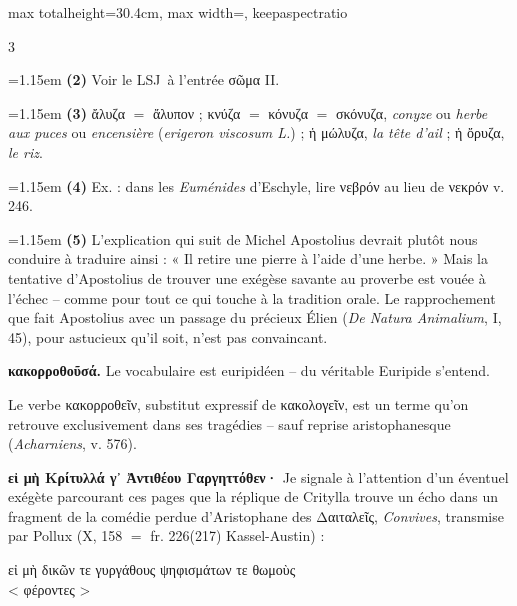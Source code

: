 \documentclass[11pt,twoside]{book}
\newcommand{\italique}[1]{\textit{#1}}
\newcommand{\citComm}[1]{\begin{quoting}[vskip=0.4pt,leftmargin=0.7em,rightmargin=0.2em]#1\end{quoting}}
\newcommand{\LSJ}{LSJ}
\newcommand{\latin}[1]{\textit{#1}}
\begin{document}
\begin{adjustbox}{max totalheight=30.4cm, max width=\textwidth, keepaspectratio}
\begin{minipage}{\textwidth}
{\begin{multicols}{3}
\par\vspace{1.5pt}
\noindent\hangindent=1.15em {\color{sepiaNote}\textbf{(2)}} Voir le \LSJ \ à l'entrée σῶμα II.
\par\vspace{1.5pt}
\noindent\hangindent=1.15em {\color{sepiaNote}\textbf{(3)}} ἄλυζα $=$ ἄλυπον ; κνύζα	 $=$ κόνυζα $=$ σκόνυζα, \italique{conyze} ou \italique{herbe aux puces} ou \italique{encensière} (\latin{erigeron viscosum L.}) ; ἡ μώλυζα, \italique{la tête d'ail} ; ἡ ὄρυζα, \italique{le riz}.
\par\vspace{1.5pt}
\noindent\hangindent=1.15em {\color{sepiaNote}\textbf{(4)}} Ex. : dans les \italique{Euménides} d'Eschyle, lire νεβρόν au lieu de νεκρόν v. 246.
\par\vspace{1.5pt}
\noindent\hangindent=1.15em {\color{sepiaNote}\textbf{(5)}} L'explication qui suit de Michel Apostolius devrait plutôt nous conduire à traduire ainsi : « Il retire une pierre à l'aide d'une herbe. » Mais la tentative d'Apostolius de trouver une exégèse savante au proverbe est vouée à l'échec -- comme pour tout ce qui touche à la tradition orale. Le rapprochement que fait Apostolius avec un passage du précieux Élien (\italique{De Natura Animalium}, I, 45), pour astucieux qu'il soit, n'est pas convaincant.
\par\vspace{1.5pt}
 \textbf{κακορροθοῦσά.} Le vocabulaire est euripidéen -- du véritable Euripide s'entend.
\par\vspace{1.5pt}
\noindent Le verbe κακορροθεῖν, substitut expressif de κακολογεῖν, est un terme qu'on retrouve exclusivement dans ses tragédies -- sauf reprise aristophanesque (\italique{Acharniens}, v. 576).
\par\vspace{1.5pt}
 \textbf{εἰ μὴ Κρίτυλλά γ᾽ Ἀντιθέου Γαργηττόθεν·} Je signale à l'attention d'un éventuel exégète parcourant ces pages que la réplique de Critylla trouve un écho dans un fragment de la comédie perdue d'Aristophane des Δαιταλεῖς, \italique{Convives}, transmise par Pollux (X, 158 $=$ fr. 226(217) Kassel-Austin) :
\citComm{εἰ μὴ δικῶν τε γυργάθους ψηφισμάτων τε θωμοὺς\\
< φέροντες >}
\par\vspace{1.5pt}

\end{multicols}}
\end{minipage}
\end{adjustbox}
\end{document}
